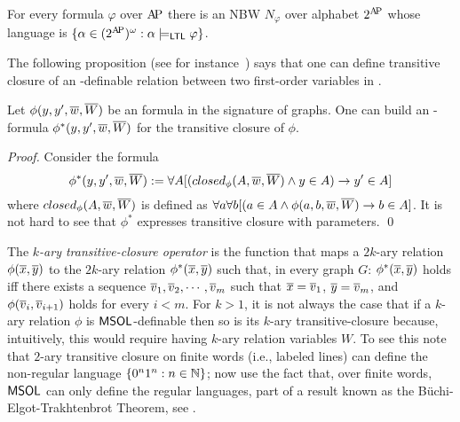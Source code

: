 \begin{theorem}[\cite{VW94}] \label{thm:LTL to NBW}
 For every \LTL formula $\varphi$ over $\mathrm{A\!P}$ there is an NBW $N_\varphi$ over alphabet $2^{\mathrm{A\!P}}$ whose language is 
 $\{\alpha \in (2^{\mathrm{A\!P}})^\omega : \alpha \models_\mathsf{LTL} \varphi\}$.
\end{theorem}

The following proposition (see for instance~\cite{CE12}) says that one can define transitive closure of an \msol-definable relation between two first-order variables in \msol. 

\begin{proposition} \label{prop:TC}
Let $\phi(y,y',\overline{w},\overline{W})$ be an \msol formula in the signature of graphs. One can build an \msol-formula $\phi^*(y,y',\overline{w},\overline{W})$ for the transitive closure of $\phi$.
\end{proposition}
\begin{proof}
Consider the \msol formula
\[
\phi^*(y,y',\overline{w},\overline{W}) := \forall A [(closed_{\phi}(A,\overline{w},\overline{W}) \wedge y \in A) \rightarrow y' \in A] 
\]
where $closed_{\phi}(A,\overline{w},\overline{W})$ is defined as $\forall a \forall b[(a \in A \wedge \phi(a,b,\overline{w},\overline{W}) \rightarrow b \in A]$. 
It is not hard to see that $\phi^*$ expresses transitive closure with parameters. 
\qed
\end{proof}

\begin{remark}
The {\em $k$-ary transitive-closure operator} is the function that maps a $2k$-ary relation $\phi(\overline{x},\overline{y})$ to the $2k$-ary relation $\phi^*(\overline{x},\overline{y})$ such that, in every graph $G$: $\phi^*(\overline{x},\overline{y})$ holds iff there exists a sequence $\overline{v}_1, \overline{v}_2, \cdots, \overline{v}_m$ such that $\overline{x} = \overline{v}_1$, $\overline{y} = \overline{v}_m$, and $\phi(\overline{v}_i,\overline{v}_{i+1})$ holds for every $i < m$. 
For $k > 1$, it is not always the case that if a $k$-ary relation $\phi$ is $\mathsf{MSOL}$-definable then so is its $k$-ary transitive-closure because, intuitively, this would require having $k$-ary relation variables $W$. To see this note that $2$-ary transitive closure on finite words (i.e., labeled lines) can define the non-regular language $\{0^n1^n : n \in \mathbb{N}\}$; now use the fact that, over finite words, $\mathsf{MSOL}$ can only define the regular languages, part of a result known as the B\"uchi-Elgot-Trakhtenbrot Theorem, see \cite{Thomas96}.
\end{remark}



